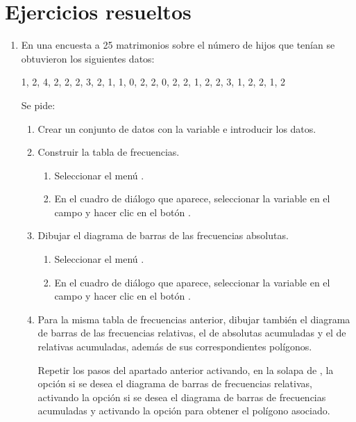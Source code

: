 \section{Ejercicios resueltos}
\begin{enumerate}[leftmargin=*]

\item  En una encuesta a 25 matrimonios sobre el número de hijos que tenían se obtuvieron los siguientes datos:
\begin{center}
1, 2, 4, 2, 2, 2, 3, 2, 1, 1, 0, 2, 2, 0, 2, 2, 1, 2, 2, 3, 1, 2, 2, 1, 2
\end{center}
Se pide:
\begin{enumerate}
\item Crear un conjunto de datos con la variable  e introducir los datos.

\item Construir la tabla de frecuencias.
\begin{indicacion}
\begin{enumerate}
\item Seleccionar el menú  .
\item En el cuadro de diálogo que aparece, seleccionar la variable  en el campo  y hacer clic en el botón .
\end{enumerate}
\end{indicacion}

\item  Dibujar el diagrama de barras de las frecuencias absolutas.
\begin{indicacion}
\begin{enumerate}
\item Seleccionar el menú .
\item En el cuadro de diálogo que aparece, seleccionar la variable  en el campo  y hacer
clic en el botón .
\end{enumerate}
\end{indicacion}

\item Para la misma tabla de frecuencias anterior, dibujar también el diagrama de barras de las frecuencias relativas,
el de absolutas acumuladas y el de relativas acumuladas, además de sus correspondientes polígonos.
\begin{indicacion}Repetir los pasos del apartado anterior activando, en la solapa de ,
la opción  si se desea el diagrama de barras de frecuencias relativas, activando la opción
 si se desea el diagrama de barras de frecuencias acumuladas y activando la opción
 para obtener el polígono asociado.
\end{indicacion}
\end{enumerate}


\end{enumerate}
